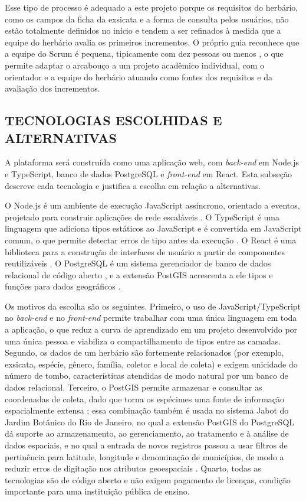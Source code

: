 \documentclass[
    12pt,        %
    openany,     %
    oneside,     %
    a4paper,     %
    english,     %
    french,      %
    spanish,     %
    brazil,      %
    article      %
]{abntex2}
\begin{document}
Esse tipo de processo é adequado a este projeto porque os requisitos do herbário, como os campos da ficha da exsicata e a forma de consulta pelos usuários, não estão totalmente definidos no início e tendem a ser refinados à medida que a equipe do herbário avalia os primeiros incrementos. O próprio guia reconhece que a equipe do Scrum é pequena, tipicamente com dez pessoas ou menos \cite{schwaber2020scrum}, o que permite adaptar o arcabouço a um projeto acadêmico individual, com o orientador e a equipe do herbário atuando como fontes dos requisitos e da avaliação dos incrementos.

\subsection{TECNOLOGIAS ESCOLHIDAS E ALTERNATIVAS}
\label{subsec:tecnologias}

A plataforma será construída como uma aplicação web, com \textit{back-end} em Node.js e TypeScript, banco de dados PostgreSQL e \textit{front-end} em React. Esta subseção descreve cada tecnologia e justifica a escolha em relação a alternativas.

O Node.js é um ambiente de execução JavaScript assíncrono, orientado a eventos, projetado para construir aplicações de rede escaláveis \cite{nodejs2026about}. O TypeScript é uma linguagem que adiciona tipos estáticos ao JavaScript e é convertida em JavaScript comum, o que permite detectar erros de tipo antes da execução \cite{typescript2026}. O React é uma biblioteca para a construção de interfaces de usuário a partir de componentes reutilizáveis \cite{react2026learn}. O PostgreSQL é um sistema gerenciador de banco de dados relacional de código aberto \cite{postgresql2026about}, e a extensão PostGIS acrescenta a ele tipos e funções para dados geográficos \cite{postgis2026}.

Os motivos da escolha são os seguintes. Primeiro, o uso de JavaScript/TypeScript no \textit{back-end} e no \textit{front-end} permite trabalhar com uma única linguagem em toda a aplicação, o que reduz a curva de aprendizado em um projeto desenvolvido por uma única pessoa e viabiliza o compartilhamento de tipos entre as camadas. Segundo, os dados de um herbário são fortemente relacionados (por exemplo, exsicata, espécie, gênero, família, coletor e local de coleta) e exigem unicidade do número de tombo, características atendidas de modo natural por um banco de dados relacional. Terceiro, o PostGIS permite armazenar e consultar as coordenadas de coleta, dado que torna os espécimes uma fonte de informação espacialmente extensa \cite{heberling2022bigdata}; essa combinação também é usada no sistema Jabot do Jardim Botânico do Rio de Janeiro, no qual a extensão PostGIS do PostgreSQL dá suporte ao armazenamento, ao gerenciamento, ao tratamento e à análise de dados espaciais, e no qual a entrada de novos registros passou a usar filtros de pertinência para latitude, longitude e denominação de municípios, de modo a reduzir erros de digitação nos atributos geoespaciais \cite{silva2017jabot}. Quarto, todas as tecnologias são de código aberto e não exigem pagamento de licenças, condição importante para uma instituição pública de ensino.
\end{document}
